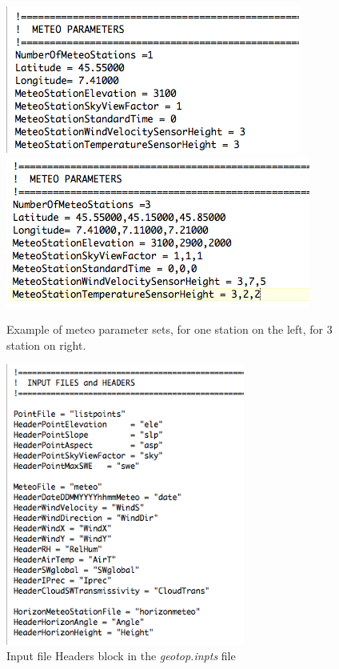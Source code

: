 \begin{figure}[h!]
\begin{center}
{\includegraphics[width=.48\columnwidth]{./images/pic_template/meteoPARAM_1stazione.png}} \quad
{\includegraphics[width=.48\columnwidth]{./images/pic_template/meteoPARAM_stazioni.png}} \\
\caption{Example of meteo parameter sets, for one station on the left, for 3 station on right.}
\label{meteoPAR}
\end{center}
\end{figure}

\begin{figure}[!h]
\begin{center}
   \includegraphics[width=0.7\textwidth]{./images/pic_template/InputFile&Headers.png}
    \caption{Input file Headers block in the {\it geotop.inpts} file} \label{inputHeader}
\end{center}
\end{figure}
